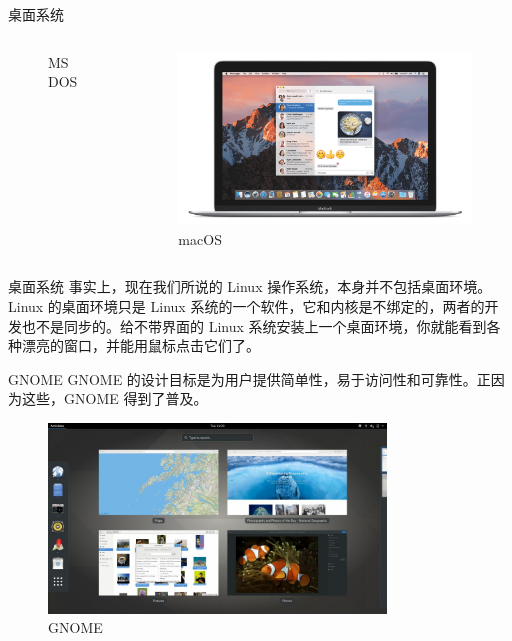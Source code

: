 \documentclass[UTF8]{ctexbeamer}
\begin{document}
\begin{frame}{桌面系统}
\begin{columns}
\begin{figure}
            \caption{MS DOS}
            \label{fig:msdos}
        \end{figure}
        \begin{figure}
            \centering
            \includegraphics[width=\textwidth]{macos.png}
            \caption{macOS}
            \label{fig:macOS}
        \end{figure}
    \end{columns}
\end{frame}

\begin{frame}{桌面系统}
    事实上，现在我们所说的 Linux 操作系统，本身并不包括桌面环境。Linux 的桌面环境只是 Linux 系统的一个软件，它和内核是不绑定的，两者的开发也不是同步的。给不带界面的 Linux 系统安装上一个桌面环境，你就能看到各种漂亮的窗口，并能用鼠标点击它们了。
\end{frame}

\begin{frame}{GNOME}
    GNOME 的设计目标是为用户提供简单性，易于访问性和可靠性。正因为这些，GNOME 得到了普及。
    
    \begin{figure}
        \centering
        \includegraphics[width=0.8\textwidth]{gnome.png}
        \caption{GNOME}
        \label{fig:gnome}
    \end{figure}
\end{frame}
\end{document}
